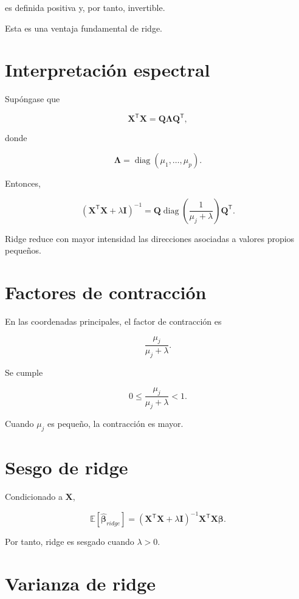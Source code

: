 \documentclass[
  spanish,
  11pt,
  letterpaper,
  DIV=11,
  numbers=noendperiod]{scrreprt}
\theoremstyle{definition}
\theoremstyle{plain}
\theoremstyle{definition}
\theoremstyle{remark}
\begin{document}
es definida positiva y, por tanto, invertible.

Esta es una ventaja fundamental de ridge.

\section{Interpretación espectral}\label{interpretaciuxf3n-espectral}

Supóngase que

\[
\mathbf{X}^{\mathsf T}\mathbf{X}
=
\mathbf{Q}
\boldsymbol{\Lambda}
\mathbf{Q}^{\mathsf T},
\]

donde

\[
\boldsymbol{\Lambda}
=
\operatorname{diag}
(\mu_1,\ldots,\mu_p).
\]

Entonces,

\[
\left(
\mathbf{X}^{\mathsf T}\mathbf{X}
+
\lambda\mathbf{I}
\right)^{-1}
=
\mathbf{Q}
\operatorname{diag}
\left(
\frac{1}{\mu_j+\lambda}
\right)
\mathbf{Q}^{\mathsf T}.
\]

Ridge reduce con mayor intensidad las direcciones asociadas a valores
propios pequeños.

\section{Factores de contracción}\label{factores-de-contracciuxf3n}

En las coordenadas principales, el factor de contracción es

\[
\frac{\mu_j}{\mu_j+\lambda}.
\]

Se cumple

\[
0
\leq
\frac{\mu_j}{\mu_j+\lambda}
<
1.
\]

Cuando \(\mu_j\) es pequeño, la contracción es mayor.

\section{Sesgo de ridge}\label{sesgo-de-ridge}

Condicionado a \(\mathbf{X}\),

\[
\mathbb{E}
[
\widehat{\boldsymbol{\beta}}_{ridge}
]
=
\left(
\mathbf{X}^{\mathsf T}\mathbf{X}
+
\lambda\mathbf{I}
\right)^{-1}
\mathbf{X}^{\mathsf T}\mathbf{X}
\boldsymbol{\beta}.
\]

Por tanto, ridge es sesgado cuando \(\lambda>0\).

\section{Varianza de ridge}\label{varianza-de-ridge}
\end{document}
